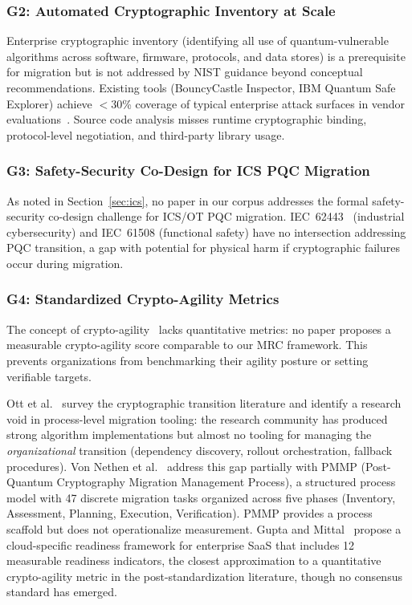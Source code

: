 \documentclass[journal]{IEEEtran}
\begin{document}
\subsubsection{G2: Automated Cryptographic Inventory at Scale}

Enterprise cryptographic inventory (identifying all use of quantum-vulnerable
algorithms across software, firmware, protocols, and data stores) is a
prerequisite for migration but is not addressed by NIST guidance beyond
conceptual recommendations. Existing tools (BouncyCastle Inspector, IBM
Quantum Safe Explorer) achieve $<$30\% coverage of typical enterprise attack
surfaces in vendor evaluations~\cite{xiao2023machine}. Source code analysis
misses runtime cryptographic binding, protocol-level negotiation, and
third-party library usage.

\subsubsection{G3: Safety-Security Co-Design for ICS PQC Migration}

As noted in Section~\ref{sec:ics}, no paper in our corpus addresses the formal
safety-security co-design challenge for ICS/OT PQC migration. IEC~62443~\cite{iec62443}
(industrial cybersecurity) and IEC~61508 (functional safety) have no
intersection addressing PQC transition, a gap with potential for physical harm
if cryptographic failures occur during migration.

\subsubsection{G4: Standardized Crypto-Agility Metrics}

The concept of crypto-agility~\cite{hoffman2022cryptoagility} lacks
quantitative metrics: no paper proposes a measurable crypto-agility score
comparable to our MRC framework. This prevents organizations from benchmarking
their agility posture or setting verifiable targets.

Ott et al.~\cite{ott2023where} survey the cryptographic transition literature
and identify a research void in process-level migration tooling: the research
community has produced strong algorithm implementations but almost no tooling
for managing the \emph{organizational} transition (dependency discovery,
rollout orchestration, fallback procedures). Von Nethen et
al.~\cite{vonnethen2024pmmp} address this gap partially with PMMP
(Post-Quantum Cryptography Migration Management Process), a structured
process model with 47 discrete migration tasks organized across five phases
(Inventory, Assessment, Planning, Execution, Verification). PMMP provides a
process scaffold but does not operationalize measurement. Gupta and
Mittal~\cite{gupta2026postquantum} propose a cloud-specific readiness
framework for enterprise SaaS that includes 12 measurable readiness
indicators, the closest approximation to a quantitative crypto-agility metric
in the post-standardization literature, though no consensus standard has
emerged.
\end{document}
